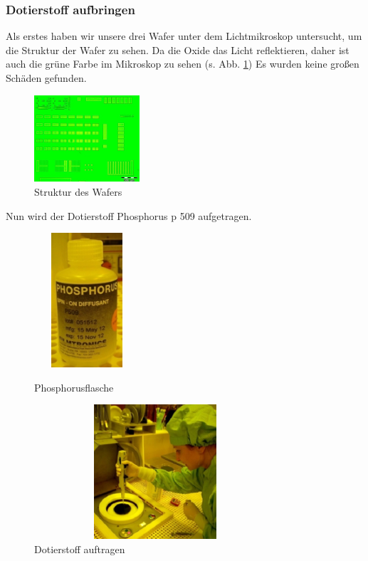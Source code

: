 \subsubsection[Dotierstoff aufbringen]{Dotierstoff aufbringen}

Als erstes haben wir unsere drei Wafer unter dem Lichtmikroskop untersucht, um die Struktur der Wafer zu sehen. Da die Oxide das Licht reflektieren, daher ist auch die grüne Farbe im Mikroskop zu sehen (s. Abb. \ref{fig:Mikroskopbild1}) Es wurden keine großen Schäden gefunden.

\begin{figure}[H]
    \centering
        \includegraphics[width=0.35\textwidth]{bilder/Mikroskopbild1.png}
    \caption{Struktur des Wafers}
    \label{fig:Mikroskopbild1}
\end{figure}


Nun wird der Dotierstoff Phosphorus p 509 aufgetragen.


\begin{figure}[H]

\begin{minipage}[hbt]{8cm}
    \centering
    \includegraphics[width=0.35\textwidth, height=5cm]{bilder/Phosphorus.png}
  \caption{Phosphorusflasche}
  \label{fig:Phosphorus}
\end{minipage}
\begin{minipage}[hbt]{6cm}
    \centering
    \includegraphics[width=0.8\textwidth,height=5cm]{bilder/Dotierstoffauftragen.png}
  \caption{Dotierstoff auftragen}
  \label{fig:Dotierstoffauftragen}
\end{minipage}

\end{figure}


